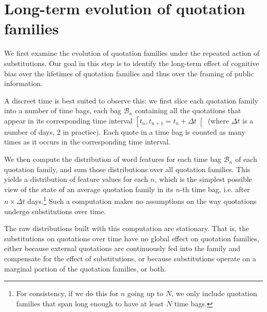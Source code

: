 




\section{Long-term evolution of quotation families}

We first examine the evolution of quotation families under the repeated action of substitutions.
Our goal in this step is to identify the long-term effect of cognitive bias over the lifetimes of quotation families and thus over the framing of public information.

A discreet time is best suited to observe this: we first slice each quotation family into a number of time bags, each bag $\mathcal{B}_n$ containing all the quotations that appear in its corresponding time interval $\left[ t_n, t_{n + 1} = t_n + \Delta t \right[$ (where $\Delta t$ is a number of days, 2 in practice).
Each quote in a time bag is counted as many times as it occurs in the corresponding time interval.

We then compute the distribution of word features for each time bag $\mathcal{B}_n$ of each quotation family, and sum those distributions over all quotation families.
This yields a distribution of feature values for each $n$, which is the simplest possible view of the state of an average quotation family in its $n$-th time bag, i.e. after $n \times \Delta t$ days.\footnote{For consistency, if we do this for $n$ going up to $N$, we only include quotation families that span long enough to have at least $N$ time bags.}
Such a computation makes no assumptions on the way quotations undergo substitutions over time.

The raw distributions built with this computation are stationary.
That is, the substitutions on quotations over time have no global effect on quotation families, either because external quotations are continuously fed into the family and compensate for the effect of substitutions, or because substitutions operate on a marginal portion of the quotation families, or both.

